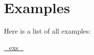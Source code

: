 \section{Examples}
Here is a list of all examples:\begin{DoxyCompactItemize}
\item 
\hyperlink{_exs_-example}{\_\-exs\_\-}
\end{DoxyCompactItemize}
